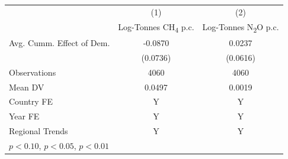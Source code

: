 \begin{tabular}{l*{2}{c}}
\hline
            &\multicolumn{1}{c}{(1)}&\multicolumn{1}{c}{(2)}\\
            &\multicolumn{1}{c}{Log-Tonnes CH\textsubscript{4} p.c.}&\multicolumn{1}{c}{Log-Tonnes N\textsubscript{2}O p.c.}\\
\hline
Avg. Cumm. Effect of Dem.&     -0.0870         &      0.0237         \\
            &    (0.0736)         &    (0.0616)         \\
\midrule
Observations&        4060         &        4060         \\
Mean DV     &      0.0497         &      0.0019         \\
Country FE  &           Y         &           Y         \\
Year FE     &           Y         &           Y         \\
Regional Trends&           Y         &           Y         \\
\hline
\multicolumn{3}{l}{\footnotesize \sym{*} \(p<0.10\), \sym{**} \(p<0.05\), \sym{***} \(p<0.01\)}\\
\end{tabular}
